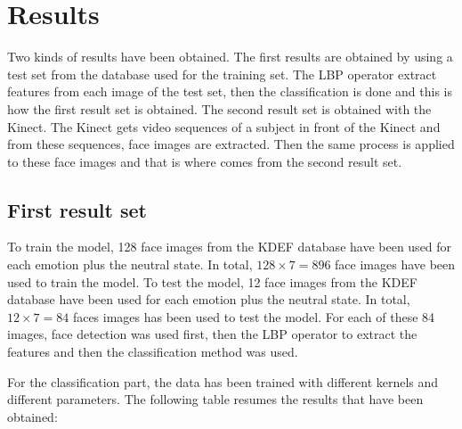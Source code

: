 \chapter{Results}
\label{chap:eval_results}

\noindent Two kinds of results have been obtained. The first results are obtained by using a test set from the database used for the training set. The LBP operator extract features from each image of the test set, then the classification is done and this is how the first result set is obtained. The second result set is obtained with the Kinect. The Kinect gets video sequences of a subject in front of the Kinect and from these sequences, face images are extracted. Then the same process is applied to these face images and that is where comes from the second result set.
\newline

\section{First result set}

\vspace{\baselineskip}
\noindent To train the model, 128 face images from the KDEF database have been used for each emotion plus the neutral state. In total, $ 128\times7 = 896 $ face images have been used to train the model. To test the model, 12 face images from the KDEF database have been used for each emotion plus the neutral state. In total, $ 12\times7 = 84 $ faces images has been used to test the model. For each of these 84 images, face detection was used first, then the LBP operator to extract the features and then the classification method was used.
\newline

\noindent For the classification part, the data has been trained with different kernels and different parameters. The following table resumes the results that have been obtained:
\newline

